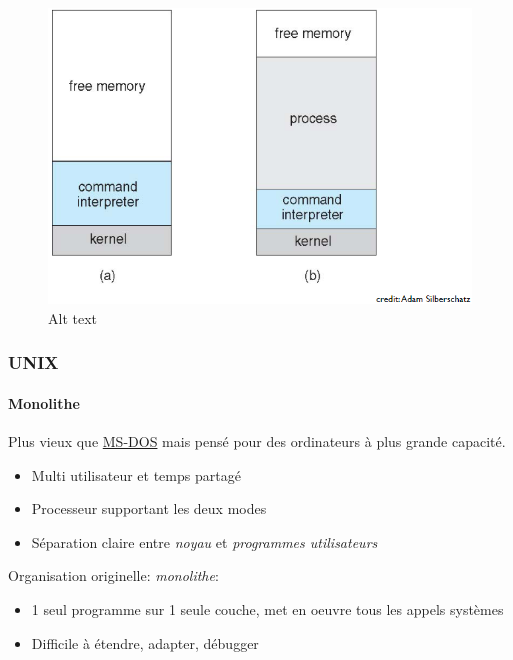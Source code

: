 \begin{figure}
\centering
\includegraphics{image-17.png}
\caption{Alt text}
\end{figure}

\subsubsection{UNIX}\label{unix}

\paragraph{Monolithe}\label{monolithe}

Plus vieux que \hyperref[ms-dos]{MS-DOS} mais pensé pour des ordinateurs
à plus grande capacité.

\begin{itemize}
\tightlist
\item
  Multi utilisateur et temps partagé
\item
  Processeur supportant les deux modes
\item
  Séparation claire entre \emph{noyau} et \emph{programmes utilisateurs}
\end{itemize}

Organisation originelle: \emph{monolithe}:

\begin{itemize}
\tightlist
\item
  1 seul programme sur 1 seule couche, met en oeuvre tous les appels
  systèmes
\item
  Difficile à étendre, adapter, débugger
\end{itemize}

